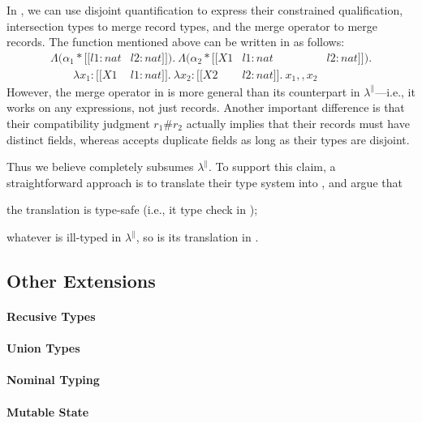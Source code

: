 In \fnamee, we can use disjoint quantification to express their constrained
qualification, intersection types to merge record types, and the merge operator
to merge records. The function mentioned above can be written in \fnamee as
follows:
\begin{align*}
  \Lambda (\alpha_1 * [[ {l1 : nat} & {l2 : nat} ]]) .\  \Lambda (\alpha_2 * [[  X1 & {l1 : nat} & {l2 : nat} ]]) . \\
  \qquad \lambda x_1 : [[X1 & {l1 : nat}]] .\  \lambda x_2 : [[X2 & {l2 : nat}]] .\ x_1 ,, x_2
\end{align*}
However, the merge operator in \fnamee is more general than its counterpart in
$\lambda^{\|}$---i.e., it works on any expressions, not just records. Another
important difference is that their compatibility judgment $r_1 \# r_2$ actually
implies that their records must have distinct fields, whereas \fnamee accepts duplicate
fields as long as their types are disjoint.

Thus we believe \fnamee completely subsumes $\lambda^{\|}$. To support this
claim, a straightforward approach is to translate their type system into
\fnamee, and argue that
\begin{inparaenum}[(1)]
\item the translation is type-safe (i.e., it type check in \fnamee);
\item whatever is ill-typed in $\lambda^{\|}$, so is its translation in \fnamee.
\end{inparaenum}


\subsection{Other Extensions}

\paragraph{Recusive Types}


\paragraph{Union Types}

\paragraph{Nominal Typing}


\paragraph{Mutable State}



